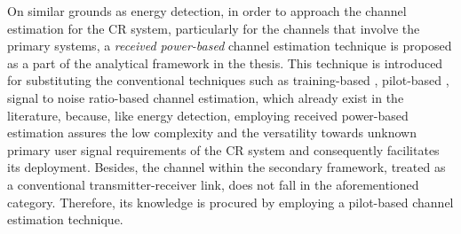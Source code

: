 On similar grounds as energy detection, in order to approach the channel estimation for the CR system, particularly for the channels that involve the primary systems, a \textit{received power-based} channel estimation technique is proposed as a part of the analytical framework in the thesis. This technique is introduced for substituting the conventional techniques such as training-based \cite{Stoica03}, pilot-based \cite{Gifford05, Gifford08}, signal to noise ratio-based \cite{Chav11, Sharma13} channel estimation, which already exist in the literature, because, like energy detection, employing received power-based estimation assures the low complexity and the versatility towards unknown primary user signal requirements of the CR system and consequently facilitates its deployment. Besides, the channel within the secondary framework, treated as a conventional transmitter-receiver link, does not fall in the aforementioned category. Therefore, its knowledge is procured by employing a pilot-based channel estimation technique.

